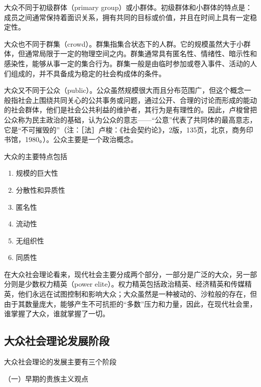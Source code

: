 \documentclass[UTF8,12pt]{ctexart}
\numberwithin{equation}{section} %
\numberwithin{figure}{section}
\numberwithin{table}{section}
\begin{document}
	大众不同于初级群体（primary group）或小群体。初级群体和小群体的特点是：成员之间通常保持着面识关系，拥有共同的目标或价值，并且在时间上具有一定稳定性。
	
	大众也不同于群集（crowd）。群集指集合状态下的人群。它的规模虽然大于小群体，但通常局限于一定的物理空间之内。群集通常具有匿名性、情绪性、暗示性和感染性，能够从事一定的集合行为。群集一般是由临时参加或卷入事件、活动的人们组成的，并不具备成为稳定的社会构成体的条件。
	
	大众又不同于公众（public）。公众虽然规模很大而且分布范围广，但这个概念一般指社会上围绕共同关心的公共事务或问题，通过公开、合理的讨论而形成的能动的社会群体，他们是社会公共利益的维护者，其行为是有理性的。因此，卢梭曾把公众称为民主政治的基础，认为公众的意志——“公意”代表了共同体的最高意志，它是“不可摧毁的”（注：［法］卢梭：《社会契约论》，2版，135页，北京，商务印书馆，1980。）。公众主要是一个政治概念。
	
	大众的主要特点包括
	\begin{enumerate}
		\item 规模的巨大性
		
		\item 分散性和异质性
		
		\item 匿名性
		
		\item 流动性
		
		\item 无组织性
		
		\item 同质性
	\end{enumerate} 
	
	在大众社会理论看来，现代社会主要分成两个部分，一部分是广泛的大众，另一部分则是少数权力精英（power elite）。权力精英包括政治精英、经济精英和传媒精英，他们永远在试图控制和影响大众；大众虽然是一种被动的、沙粒般的存在，但由于其数量庞大，能够产生不可抗拒的“多数”压力和力量，因此，在现代社会里，谁掌握了大众，谁就掌握了一切。
	
	\subsection{大众社会理论发展阶段}
	
	大众社会理论的发展主要有三个阶段
	
	（一）早期的贵族主义观点
	
\end{document}
